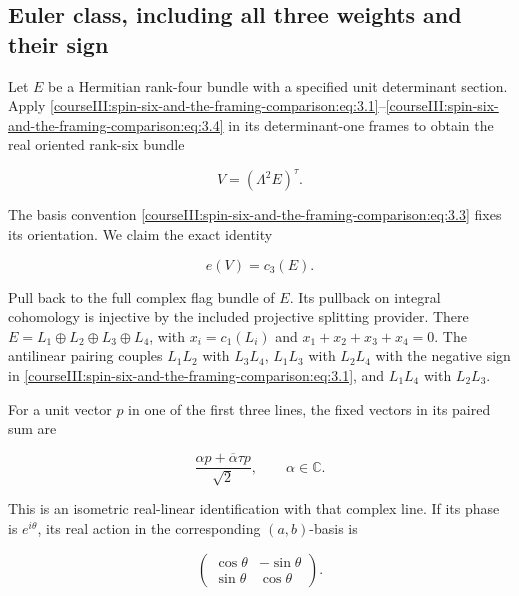 \subsection{Euler class, including all three weights and their sign}
\label{courseIII:spin-six-and-the-framing-comparison:framing-euler-comparison}

\label{courseIII:spin-six-and-the-framing-comparison:section-4}\label{courseIII:spin6:4}

Let \(E\) be a Hermitian rank-four bundle with a specified unit determinant section. Apply \eqref{courseIII:spin-six-and-the-framing-comparison:eq:3.1}--\eqref{courseIII:spin-six-and-the-framing-comparison:eq:3.4} in its determinant-one frames to obtain the real oriented rank-six bundle

\begin{equation}
V=(\Lambda^2E)^\tau.
\label{courseIII:spin-six-and-the-framing-comparison:eq:4.1}
\end{equation}

The basis convention \eqref{courseIII:spin-six-and-the-framing-comparison:eq:3.3} fixes its orientation. We claim the exact identity

\begin{equation}
e(V)=c_3(E).
\label{courseIII:spin-six-and-the-framing-comparison:eq:4.2}
\end{equation}

Pull back to the full complex flag bundle of \(E\). Its pullback on integral cohomology is injective by the included projective splitting provider. There \(E=L_1\oplus L_2\oplus L_3\oplus L_4\), with \(x_i=c_1(L_i)\) and \(x_1+x_2+x_3+x_4=0\). The antilinear pairing couples \(L_1L_2\) with \(L_3L_4\), \(L_1L_3\) with \(L_2L_4\) with the negative sign in \eqref{courseIII:spin-six-and-the-framing-comparison:eq:3.1}, and \(L_1L_4\) with \(L_2L_3\).

For a unit vector \(p\) in one of the first three lines, the fixed vectors in its paired sum are

\begin{equation}
\frac{\alpha p+\overline\alpha\tau p}{\sqrt2},
\qquad \alpha\in\mathbb C.
\label{courseIII:spin-six-and-the-framing-comparison:eq:4.3}
\end{equation}

This is an isometric real-linear identification with that complex line. If its phase is \(e^{i\theta}\), its real action in the corresponding \((a,b)\)-basis is

\begin{equation}
\begin{pmatrix}\cos\theta&-\sin\theta\\
\sin\theta&\cos\theta\end{pmatrix}.
\label{courseIII:spin-six-and-the-framing-comparison:eq:4.4}
\end{equation}

